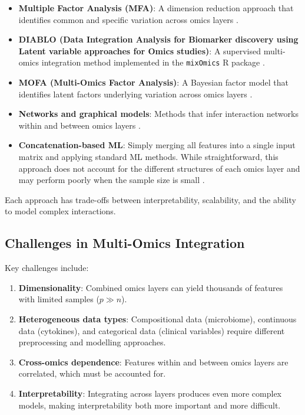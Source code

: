 \documentclass[12pt,a4paper]{report}
\begin{document}
\begin{itemize}
    \item \textbf{Multiple Factor Analysis (MFA)}: A dimension reduction approach that identifies common and specific variation across omics layers \cite{eslami2013}.
    \item \textbf{DIABLO (Data Integration Analysis for Biomarker discovery using Latent variable approaches for Omics studies)}: A supervised multi-omics integration method implemented in the \texttt{mixOmics} R package \cite{singh2019, rohart2017}.
    \item \textbf{MOFA (Multi-Omics Factor Analysis)}: A Bayesian factor model that identifies latent factors underlying variation across omics layers \cite{argelaguet2018}.
    \item \textbf{Networks and graphical models}: Methods that infer interaction networks within and between omics layers \cite{klingstrom2018}.
    \item \textbf{Concatenation-based ML}: Simply merging all features into a single input matrix and applying standard ML methods. While straightforward, this approach does not account for the different structures of each omics layer and may perform poorly when the sample size is small \cite{topcuoglu2021}.
\end{itemize}

Each approach has trade-offs between interpretability, scalability, and the ability to model complex interactions.

\subsection{Challenges in Multi-Omics Integration}

Key challenges include:
\begin{enumerate}
    \item \textbf{Dimensionality}: Combined omics layers can yield thousands of features with limited samples ($p \gg n$).
    \item \textbf{Heterogeneous data types}: Compositional data (microbiome), continuous data (cytokines), and categorical data (clinical variables) require different preprocessing and modelling approaches.
    \item \textbf{Cross-omics dependence}: Features within and between omics layers are correlated, which must be accounted for.
    \item \textbf{Interpretability}: Integrating across layers produces even more complex models, making interpretability both more important and more difficult.
\end{enumerate}
\end{document}
